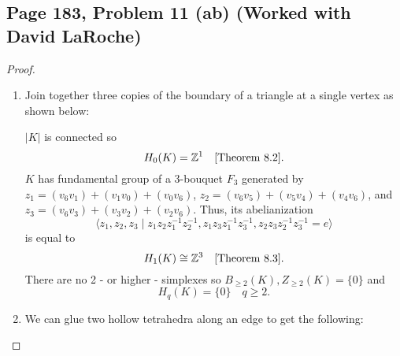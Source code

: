 \usetikzlibrary{decorations.markings,arrows.meta,bending, patterns, math}

\subsection*{Page 183, Problem 11 (ab) (Worked with David LaRoche)}
\vspace{15pt}
\begin{proof}
    \vspace{-10pt}
    \begin{enumerate}[label = (\alph*)]
        \item Join together three copies of the boundary of a triangle at a single vertex as shown below:
        \begin{center} \; \end{center}
        $|K|$ is connected so $$H_0(K) = \mathbb{Z}^1 \quad \text{[Theorem 8.2]}.$$ $K$ has fundamental group of a 3-bouquet $F_3$ generated by $z_1 = (v_6v_1) + (v_1v_0) + (v_0v_6)$, $z_2 = (v_6v_5) + (v_5v_4) + (v_4v_6)$, and $z_3 = (v_6v_3) + (v_3v_2) + (v_2v_6).$ Thus, its abelianization \[\langle z_1, z_2, z_3 \mid z_1z_2z_1^{-1}z_2^{-1}, z_1z_3z_1^{-1}z_3^{-1}, z_2z_3z_2^{-1}z_3^{-1} = e \rangle\] is equal to $$H_1(K) \cong \mathbb{Z}^3\quad \text{[Theorem 8.3]}.$$ There are no 2 - or higher - simplexes so $B_{\geq 2}(K), Z_{\geq 2}(K) = \{0\}$ and $$H_q(K) = \{0\} \quad q \geq 2.$$

        \item We can glue two hollow tetrahedra along an edge to get the following:
        \begin{center}
\end{center}
\end{enumerate}
\end{proof}
